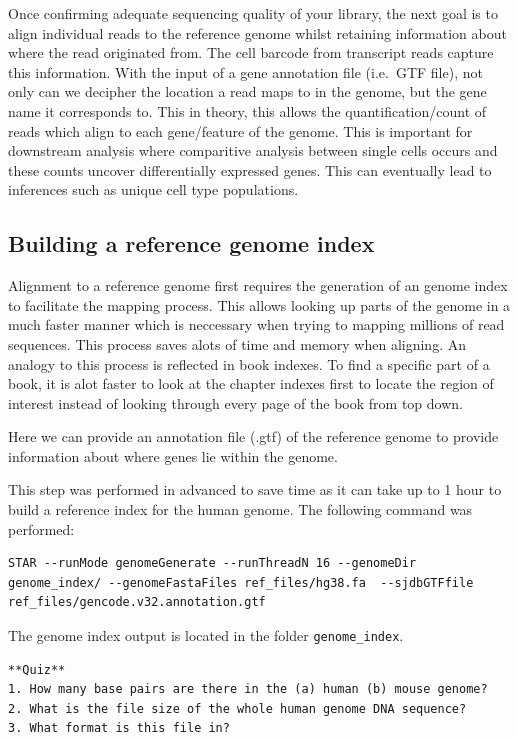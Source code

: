 \documentclass[]{book}
\begin{document}
Once confirming adequate sequencing quality of your library, the next goal is to align individual reads to the reference genome whilst retaining information about where the read originated from. The cell barcode from transcript reads capture this information. With the input of a gene annotation file (i.e.~GTF file), not only can we decipher the location a read maps to in the genome, but the gene name it corresponds to. This in theory, this allows the quantification/count of reads which align to each gene/feature of the genome. This is important for downstream analysis where comparitive analysis between single cells occurs and these counts uncover differentially expressed genes. This can eventually lead to inferences such as unique cell type populations.

\hypertarget{building-a-reference-genome-index}{%
\subsection{Building a reference genome index}\label{building-a-reference-genome-index}}

Alignment to a reference genome first requires the generation of an genome index to facilitate the mapping process. This allows looking up parts of the genome in a much faster manner which is neccessary when trying to mapping millions of read sequences. This process saves alots of time and memory when aligning. An analogy to this process is reflected in book indexes. To find a specific part of a book, it is alot faster to look at the chapter indexes first to locate the region of interest instead of looking through every page of the book from top down.

Here we can provide an annotation file (.gtf) of the reference genome to provide information about where genes lie within the genome.

This step was performed in advanced to save time as it can take up to 1 hour to build a reference index for the human genome. The following command was performed:

\begin{verbatim}
STAR --runMode genomeGenerate --runThreadN 16 --genomeDir genome_index/ --genomeFastaFiles ref_files/hg38.fa  --sjdbGTFfile ref_files/gencode.v32.annotation.gtf
\end{verbatim}

The genome index output is located in the folder \texttt{genome\_index}.

\begin{verbatim}
**Quiz**
1. How many base pairs are there in the (a) human (b) mouse genome?
2. What is the file size of the whole human genome DNA sequence?
3. What format is this file in?
\end{verbatim}
\end{document}
